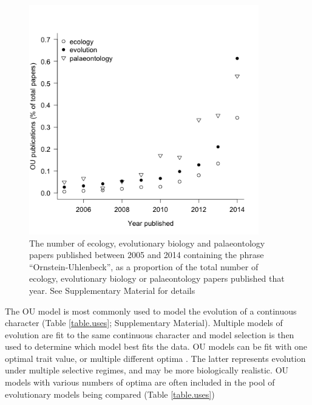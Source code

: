 \documentclass[a4paper,12pt]{article}
\begin{document}
    \begin{figure}[h]
      \centering
      \includegraphics[width=10cm, height=10cm, keepaspectratio=true]{Figures/PapersThruTime.png}
      \caption{The number of ecology, evolutionary biology and palaeontology papers published between 2005 and 2014 containing the phrase ``Ornstein-Uhlenbeck'', as a proportion of the total number of ecology, evolutionary biology or palaeontology papers published that year. See Supplementary Material for details %
      }
      \label{figure.literature}
    \end{figure}

  The OU model is most commonly used to model the evolution of a continuous character (Table \ref{table.uses}; Supplementary Material). 
  Multiple models of evolution \citep[e.g., Brownian motion, OU, Early burst etc.;][]{Harmon:2010aa,cooper2010body} are fit to the same continuous character and model selection is then used to determine which model best fits the data.  
  OU models can be fit with one optimal trait value, or multiple different optima \citep{Butler:2004aa,beaulieu2012modeling}. 
  The latter represents evolution under multiple selective regimes, and may be more biologically realistic. 
  OU models with various numbers of optima are often included in the pool of evolutionary models being compared \citep[e.g.,][]{} (Table \ref{table.uses})
  
\end{document}
